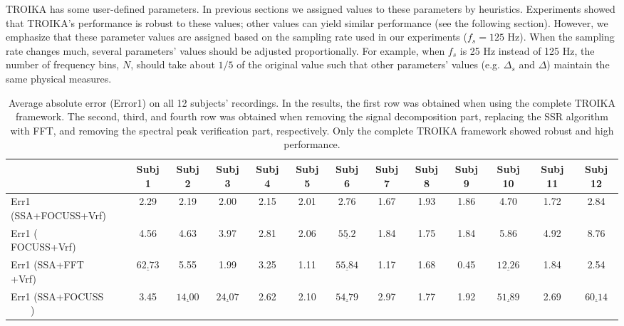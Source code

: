 \documentclass[10pt,twocolumn]{IEEEtran}
\begin{document}
TROIKA has some user-defined parameters. In previous sections we assigned values to these parameters by heuristics. Experiments showed that TROIKA's performance is robust to these values; other  values can yield similar performance (see the following section). However, we emphasize that these parameter values are assigned based on the sampling rate used in our experiments ($f_s=125$ Hz). When the sampling rate changes much, several parameters' values should be adjusted proportionally. For example, when $f_s$ is 25 Hz instead of 125 Hz, the number of frequency bins, $N$, should take about $1/5$ of the original value such that other parameters' values (e.g. $\Delta_s$ and $\Delta$) maintain the same physical measures.







\begin{table*}[t]
\renewcommand{\arraystretch}{1.2}
\caption{Average absolute error (Error1) on all 12 subjects' recordings. In the results, the first row was obtained when using the complete TROIKA framework. The second, third, and fourth row was obtained when removing the signal decomposition part, replacing the SSR algorithm with FFT, and removing the spectral peak verification part, respectively. Only the complete TROIKA framework showed robust and high performance.}
\label{table:err1}
\centering
\begin{tabular}{l|c|c|c|c|c|c|c|c|c|c|c|c}
\toprule
       &  Subj 1      & Subj 2   &  Subj 3   &  Subj 4   &Subj 5  &Subj  6  &Subj 7  &Subj  8  &Subj 9  &Subj 10 &Subj 11 & Subj 12\\
\midrule
Err1 (SSA+FOCUSS+Vrf)       &   2.29   &  2.19   &  2.00   &  2.15    & 2.01   &   2.76 & 1.67 & 1.93 & 1.86 & 4.70  & 1.72  & 2.84\\
\hline
Err1 ($\quad\quad\;$FOCUSS+Vrf)  &   4.56    & 4.63     & 3.97     & 2.81     & 2.06    & {\color{red}$\underline{55.2}$}   & 1.84  & 1.75  & 1.84  & 5.86   &  4.92  & 8.76  \\
\hline
Err1 (SSA+FFT$\quad\quad$+Vrf)       &   {\color{red}$\underline{62.73}$}   &  5.55   &  1.99   &  3.25    & 1.11   &  {\color{red}$\underline{55.84}$} & 1.17 & 1.68 & 0.45 & {\color{red}$\underline{12.26}$}  & 1.84  & 2.54 \\
\hline
Err1 (SSA+FOCUSS$\quad\quad$)       &   3.45   &  {\color{red}$\underline{14.00}$}   &  {\color{red}$\underline{24.07}$}   &  2.62    & 2.10   &  {\color{red}$\underline{54.79}$} & 2.97 & 1.77 & 1.92 & {\color{red}$\underline{51.89}$}  & 2.69  & {\color{red}$\underline{60.14}$} \\
\bottomrule
\end{tabular}
\end{table*}
\end{document}
